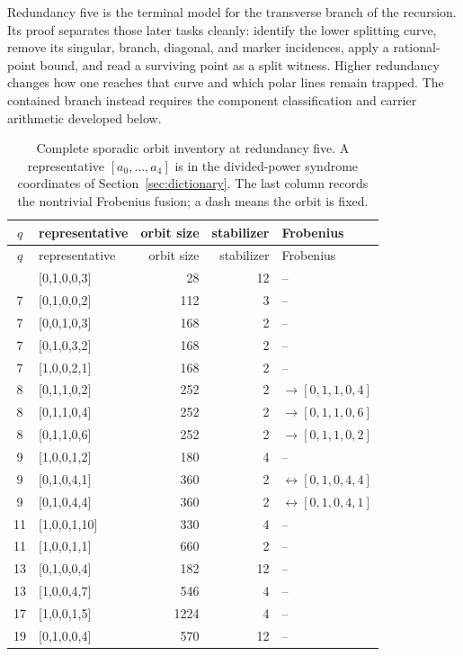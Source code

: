 Redundancy five is the terminal model for the transverse branch of the
recursion.  Its proof separates those later tasks cleanly: identify the lower
splitting curve, remove its singular, branch, diagonal, and marker incidences,
apply a rational-point bound, and read a surviving point as a split witness.
Higher redundancy changes how one reaches that curve and which polar lines
remain trapped.  The contained branch instead requires the component
classification and carrier arithmetic developed below.

\pagebreak[4]
\begin{longtable}{c>{\ttfamily\small}lrrl}
\caption{Complete sporadic orbit inventory at redundancy five.  A
representative $[a_0,\ldots,a_4]$ is in the divided-power syndrome
coordinates of Section~\ref{sec:dictionary}.  The last column records
the nontrivial Frobenius fusion; a dash means the orbit is fixed.}
\label{tab:r5sporadic}\\
\toprule
$q$ & \normalfont representative & orbit size & stabilizer & Frobenius\\
\midrule
\endfirsthead
\toprule
$q$ & \normalfont representative & orbit size & stabilizer & Frobenius\\
\midrule
\endhead
\bottomrule
\endfoot
7  & [0,1,0,0,3] & 28  & 12 & --\\
7  & [0,1,0,0,2] & 112 & 3  & --\\
7  & [0,0,1,0,3] & 168 & 2  & --\\
7  & [0,1,0,3,2] & 168 & 2  & --\\
7  & [1,0,0,2,1] & 168 & 2  & --\\
8  & [0,1,1,0,2] & 252 & 2  & $\to[0,1,1,0,4]$\\
8  & [0,1,1,0,4] & 252 & 2  & $\to[0,1,1,0,6]$\\
8  & [0,1,1,0,6] & 252 & 2  & $\to[0,1,1,0,2]$\\
9  & [1,0,0,1,2] & 180 & 4  & --\\
9  & [0,1,0,4,1] & 360 & 2  & $\leftrightarrow[0,1,0,4,4]$\\
9  & [0,1,0,4,4] & 360 & 2  & $\leftrightarrow[0,1,0,4,1]$\\
11 & [1,0,0,1,10]& 330 & 4  & --\\
11 & [1,0,0,1,1] & 660 & 2  & --\\
13 & [0,1,0,0,4] & 182 & 12 & --\\
13 & [1,0,0,4,7] & 546 & 4  & --\\
17 & [1,0,0,1,5] & 1224& 4  & --\\
19 & [0,1,0,0,4] & 570 & 12 & --\\
\end{longtable}


